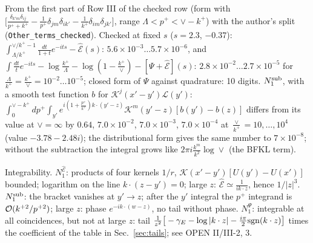 \documentclass[9pt]{article}
\numberwithin{equation}{section}
\begin{document}
{\color{gray}\small From the first part of Row III of the checked row (form with $\big[\frac{\delta_{k'm}\delta_{ij}}{p^{+}+k^{+}}-\frac{1}{p^{+}}\delta_{jm}\delta_{ik'}-\frac{1}{k^{+}}\delta_{im}\delta_{jk'}\big]$, range $\Lambda<p^{+}<\vee-k^{+}$) with the author's split (\texttt{Other\_terms\_checked}). Checked at fixed $s$ ($s=2.3$, $-0.37$): $\int_{\Lambda/k^{+}}^{\vee/k^{+}-1}\frac{dt}{1+t}e^{-its}-\widehat{\mathcal{E}}(s)$: $5.6\times10^{-3}\dots5.7\times10^{-6}$, and $\int\frac{dt}{t}e^{-its}-\log\frac{k^{+}}{\Lambda}-\log(1-\frac{k^{+}}{\vee})-[\Psi+\widehat{\mathcal{E}}](s)$: $2.8\times10^{-2}\dots2.7\times10^{-5}$ for $\frac{\Lambda}{k^{+}}=\frac{k^{+}}{\vee}=10^{-2}\dots10^{-5}$; closed form of $\Psi$ against quadrature: 10 digits. $N_{1}^{\rm sub}$, with a smooth test function $b$ for $\mathcal{K}^{j}(x'-y')\mathcal{L}(y')$: $\int_{0}^{\vee-k^{+}}dp^{+}\int_{y'}e^{i(1+\frac{p^{+}}{k^{+}})k\cdot(y'-z)}\mathcal{K}^{m}(y'-z)[b(y')-b(z)]$ differs from its value at $\vee=\infty$ by $0.64$, $7.0\times10^{-2}$, $7.0\times10^{-3}$, $7.0\times10^{-4}$ at $\frac{\vee}{k^{+}}=10,\dots,10^{4}$ (value $-3.78-2.48i$); the distributional form gives the same number to $7\times10^{-8}$; without the subtraction the integral grows like $2\pi i\frac{k^{m}}{k^{2}}\log\vee$ (the BFKL term).}\par
\noindent Integrability. $N_{1}^{\widehat{\mathcal{E}}}$: products of four kernels $1/r$, $\mathcal{K}(x'-y')[U(y')-U(x')]$ bounded; logarithm on the line $k\cdot(z-y')=0$; large $z$: $\widehat{\mathcal{E}}\simeq\frac{1}{ik\cdot z}$, hence $1/|z|^{3}$. $N_{1}^{\rm sub}$: the bracket vanishes at $y'\to z$; after the $y'$ integral the $p^{+}$ integrand is ${\cal O}(k^{+2}/p^{+2})$; large $z$: phase $e^{-ik\cdot(w-z)}$, no tail without phase. $N_{1}^{\Psi}$: integrable at all coincidences, {\color{magenta}but not at large $z$: tail $\frac{1}{z^{2}}\big[-\gamma_{E}-\log|k\cdot z|-\frac{i\pi}{2}{\rm sgn}(k\cdot z)\big]$ times the coefficient of the table in Sec.~\ref{sec:tails}; see OPEN II/III-2, 3.}
\end{document}

